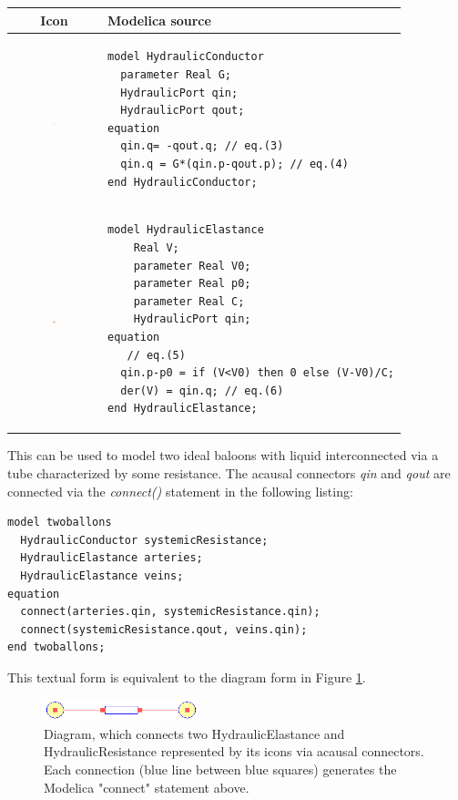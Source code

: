 \documentclass[letterpaper, 10 pt, conference]{ieeeconf}  %
\begin{document}
\begin{tabular}{cl}
Icon & Modelica source \\
\hline
\includegraphics[width=0.03\textwidth]{Resistance.png} & 
\begin{lstlisting}[language=modelica, backgroundcolor=\color{white}]
model HydraulicConductor
  parameter Real G;
  HydraulicPort qin;
  HydraulicPort qout;
equation 
  qin.q= -qout.q; // eq.(3)
  qin.q = G*(qin.p-qout.p); // eq.(4)
end HydraulicConductor;
\end{lstlisting} \\
\hline
\includegraphics[width=0.03\textwidth]{Elasticity.png} & 
\begin{lstlisting}[language=modelica, backgroundcolor=\color{white}]
model HydraulicElastance
    Real V;
    parameter Real V0;
    parameter Real p0;
    parameter Real C;
    HydraulicPort qin;
equation 
   // eq.(5)
  qin.p-p0 = if (V<V0) then 0 else (V-V0)/C;
  der(V) = qin.q; // eq.(6)
end HydraulicElastance;
\end{lstlisting}
\end{tabular}

This can be used to model two ideal baloons with liquid  interconnected via a tube characterized by some resistance. The acausal connectors \emph{qin} and \emph{qout} are connected via the \emph{connect()} statement in the following listing:
\begin{lstlisting}[language=modelica]
model twoballons
  HydraulicConductor systemicResistance;
  HydraulicElastance arteries;
  HydraulicElastance veins;
equation 
  connect(arteries.qin, systemicResistance.qin);
  connect(systemicResistance.qout, veins.qin);
end twoballons;
\end{lstlisting}

This textual form is equivalent to the diagram form in Figure \ref{fig:twoballons}.
\begin{figure}[h!]
    \centering
    \includegraphics[width=0.4\textwidth]{twoballons.png}
    \caption{Diagram, which connects two HydraulicElastance and HydraulicResistance represented by its icons via acausal connectors. Each connection (blue line between blue squares) generates the Modelica "connect" statement above.
    }
    \label{fig:twoballons}
\end{figure}
\end{document}
